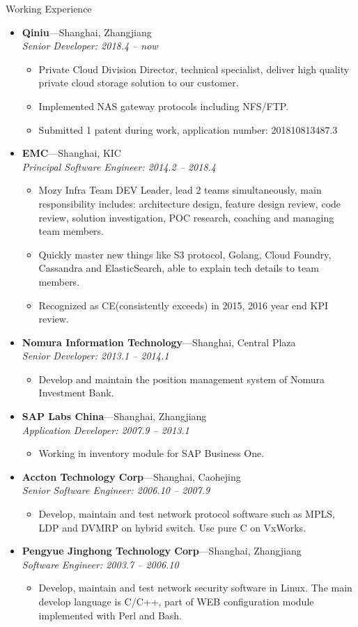 \documentclass[11pt,oneside]{article}
\newenvironment{ressection}[1]{
	\vspace{4pt}
	{\selectfont\Large#1}
	\begin{itemize}
	\vspace{3pt}
}{
	\end{itemize}
}
\newcommand{\ressubitem}[1]{
	\vspace{-1pt}
	\item \begin{flushleft} #1 \end{flushleft}
}
\newcommand{\resbigitem}[3]{
	\vspace{-5pt}
	\item
	\textbf{#1}---#2 \\
	\textit{#3}
}
\newenvironment{ressubsec}[3]{
	\resbigitem{#1}{#2}{#3}
	\vspace{-2pt}
	\begin{itemize}
}{
    \end{itemize}
}
\begin{document}
\begin{ressection}{Working Experience}

	\begin{ressubsec}{Qiniu}{Shanghai, Zhangjiang}{Senior Developer: 2018.4 -- now}
		\ressubitem{Private Cloud Division Director, technical specialist, deliver high quality private cloud storage solution to our customer.}
		\ressubitem{Implemented NAS gateway protocols including NFS/FTP.}
		\ressubitem{Submitted 1 patent during work, application number: 201810813487.3}
	\end{ressubsec}

	\begin{ressubsec}{EMC}{Shanghai, KIC}{Principal Software Engineer: 2014.2 -- 2018.4}
		\ressubitem{Mozy Infra Team DEV Leader, lead 2 teams simultaneously, main responsibility includes: architecture design, feature design review, code review, solution investigation, POC research, coaching and managing team members.}
		\ressubitem{Quickly master new things like S3 protocol, Golang, Cloud Foundry, Cassandra and ElasticSearch, able to explain tech details to team members.}
		\ressubitem{Recognized as CE(consistently exceeds) in 2015, 2016 year end KPI review.}
	\end{ressubsec}

	\begin{ressubsec}{Nomura Information Technology}{Shanghai, Central Plaza}{Senior Developer: 2013.1 -- 2014.1}
		\ressubitem{Develop and maintain the position management system of Nomura Investment Bank.}
	\end{ressubsec}

	\begin{ressubsec}{SAP Labs China}{Shanghai, Zhangjiang}{Application Developer: 2007.9 -- 2013.1}
		\ressubitem{Working in inventory module for SAP Business One.}
	\end{ressubsec}

	\begin{ressubsec}{Accton Technology Corp}{Shanghai, Caohejing}{Senior Software Engineer: 2006.10 -- 2007.9}
		\ressubitem{Develop, maintain and test network protocol software such as MPLS, LDP and DVMRP on
			hybrid switch. Use pure C on VxWorks.}
	\end{ressubsec}

	\begin{ressubsec}{Pengyue Jinghong Technology Corp}{Shanghai, Zhangjiang}{Software Engineer: 2003.7 -- 2006.10}
		\ressubitem{Develop, maintain and test network security software in Linux. The main develop
			language is C/C++, part of WEB configuration module implemented with Perl and Bash.}
	\end{ressubsec}

\end{ressection}
\end{document}
